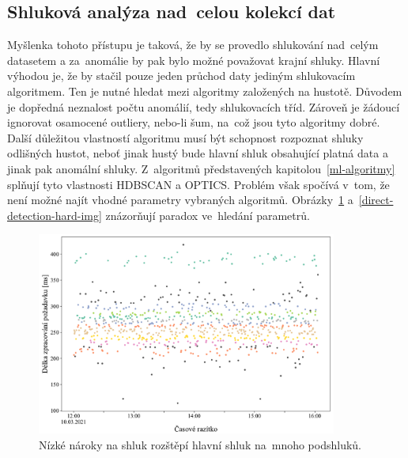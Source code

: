 \subsection{Shluková analýza nad~celou kolekcí dat}
\label{shlukova-analyza-nad-kolekci-dat}
Myšlenka tohoto přístupu je taková, že by se provedlo shlukování nad~celým datasetem a za~anomálie by pak bylo možné považovat krajní shluky. Hlavní výhodou je, že by stačil pouze jeden průchod daty jediným shlukovacím algoritmem. Ten je nutné hledat mezi algoritmy založených na hustotě. Důvodem je dopředná neznalost počtu anomálií, tedy shlukovacích tříd. Zároveň je žádoucí ignorovat osamocené outliery, nebo-li šum, na~což jsou tyto algoritmy dobré. Další důležitou vlastností algoritmu musí být schopnost rozpoznat shluky odlišných hustot, neboť jinak hustý bude hlavní shluk obsahující platná data a jinak pak anomální shluky. Z~algoritmů představených kapitolou~\ref{ml-algoritmy} splňují tyto vlastnosti HDBSCAN a OPTICS. Problém však spočívá v~tom, že není možné najít vhodné parametry vybraných algoritmů. Obrázky~\ref{direct-detection-soft-img} a~\ref{direct-detection-hard-img} znázorňují paradox ve~hledání parametrů. 

\begin{figure}[hbt]
    \centering
    \includegraphics[width=0.88\textwidth]{obrazky/direct-detection-soft.pdf}
    \caption{Nízké nároky na shluk rozštěpí hlavní shluk na~mnoho podshluků.}
    \label{direct-detection-soft-img}
\end{figure}

